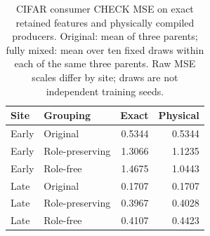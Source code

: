 \begin{table}[t]
\centering\footnotesize
\caption{CIFAR consumer CHECK MSE on exact retained features and physically compiled producers. Original: mean of three parents; fully mixed: mean over ten fixed draws within each of the same three parents. Raw MSE scales differ by site; draws are not independent training seeds.}
\label{tab:local}
\begin{tabular}{llrr}
\toprule
Site & Grouping & Exact & Physical \\
\midrule
Early & Original & 0.5344 & 0.5344 \\
Early & Role-preserving & 1.3066 & 1.1235 \\
Early & Role-free & 1.4675 & 1.0443 \\
Late & Original & 0.1707 & 0.1707 \\
Late & Role-preserving & 0.3967 & 0.4028 \\
Late & Role-free & 0.4107 & 0.4423 \\
\bottomrule
\end{tabular}
\end{table}

